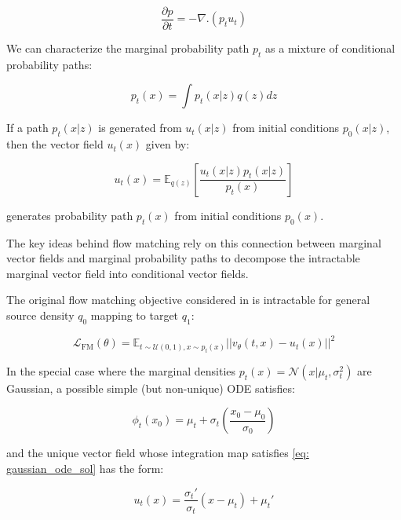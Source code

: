 \documentclass[12pt]{article}
\renewcommand{\[}{\left[}
\renewcommand{\]}{\right]}
\renewcommand{\(}{\left(}
\renewcommand{\)}{\right)}
\newcommand{\grad}[1]{\nabla #1}
\newcommand{\EE}{\mathbb{E}}
\newcommand{\CL}{\mathcal{L}}
\newcommand{\CN}{\mathcal{N}}
\begin{document}
\begin{equation}
    \frac{\partial p}{\partial t} = -\grad.\left(p_t u_t\right)
\end{equation}

We can characterize the marginal probability path $p_t$ as a mixture of conditional probability paths:

\begin{equation}
    p_t(x) = \int p_t(x | z) q(z) dz
\end{equation}

If a path $p_t(x|z)$ is generated from $u_t(x | z)$ from initial conditions $p_0(x | z)$, then the vector field $u_t(x)$ given by:

\begin{equation}
    u_t(x) = \EE_{q(z)}\left[\frac{u_t(x|z)p_t(x|z)}{p_t(x)}\right]\label{eq: marg_cond_velocity_field}
\end{equation}

generates probability path $p_t(x)$ from initial conditions $p_0(x)$.

The key ideas behind flow matching rely on this connection between marginal vector fields and marginal probability paths to decompose the intractable marginal vector field into conditional vector fields.

The original flow matching objective considered in \cite{lipman_flow_2023} is intractable for general source density $q_0$ mapping to target $q_1$:

\begin{equation}
    \CL_{\text{FM}}(\theta)= \EE_{t \sim \mathcal{U}(0, 1), x \sim p_t(x)} ||v_\theta(t, x) - u_t(x)||^2
\end{equation}

In the special case where the marginal densities $p_t(x) = \CN(x | \mu_t, \sigma_t^2)$ are Gaussian, a possible simple (but non-unique) ODE satisfies:

\begin{equation}
    \phi_t(x_0) = \mu_t + \sigma_t \left(\frac{x_0 - \mu_0}{\sigma_0}\right) \label{eq: gaussian_ode_sol}
\end{equation}

and the unique vector field whose integration map satisfies \eqref{eq: gaussian_ode_sol} has the form:

\begin{equation}
    u_t(x) = \frac{\sigma_t'}{\sigma_t} (x - \mu_t) + \mu_t' \label{eq: vector_field_gauss_dens}
\end{equation}
\end{document}
